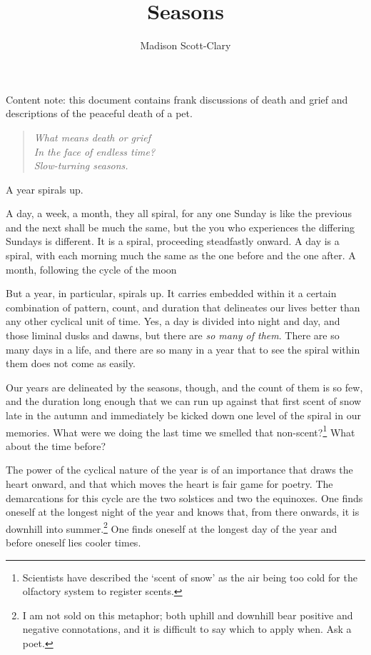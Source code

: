 \documentclass[12pt,oneside]{memoir}
\title{Seasons}
\author{Madison Scott-Clary}
\begin{document}
\maketitle

\begin{center}
  \footnotesize Content note: this document contains frank discussions of death and grief and descriptions of the peaceful death of a pet.\normalsize
\end{center}

\vskip1cm

\begin{verse}
\centering
  \emph{What means death or grief} \\
  \emph{In the face of endless time?} \\
  \emph{Slow-turning seasons.}
\end{verse}

A year spirals up.

A day, a week, a month, they all spiral, for any one Sunday is like the previous and the next shall be much the same, but the you who experiences the differing Sundays is different. It is a spiral, proceeding steadfastly onward. A day is a spiral, with each morning much the same as the one before and the one after. A month, following the cycle of the moon

But a year, in particular, spirals up. It carries embedded within it a certain combination of pattern, count, and duration that delineates our lives better than any other cyclical unit of time. Yes, a day is divided into night and day, and those liminal dusks and dawns, but there are \emph{so many of them}. There are so many days in a life, and there are so many in a year that to see the spiral within them does not come as easily.

Our years are delineated by the seasons, though, and the count of them is so few, and the duration long enough that we can run up against that first scent of snow late in the autumn and immediately be kicked down one level of the spiral in our memories. What were we doing the last time we smelled that non-scent?\footnote{Scientists have described the `scent of snow' as the air being too cold for the olfactory system to register scents.} What about the time before?

The power of the cyclical nature of the year is of an importance that draws the heart onward, and that which moves the heart is fair game for poetry. The demarcations for this cycle are the two solstices and two the equinoxes. One finds oneself at the longest night of the year and knows that, from there onwards, it is downhill into summer.\footnote{I am not sold on this metaphor; both uphill and downhill bear positive and negative connotations, and it is difficult to say which to apply when. Ask a poet.} One finds oneself at the longest day of the year and before oneself lies cooler times.
\end{document}
